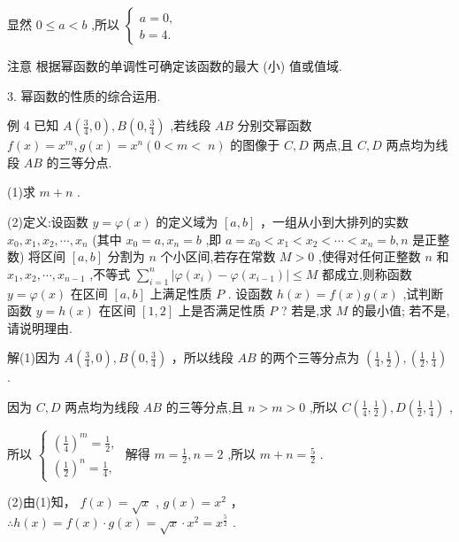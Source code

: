 \documentclass[10pt]{article}
\begin{document}
显然 \(0 \leq  a < b\) ,所以 \(\left\{  \begin{array}{l} a = 0, \\  b = 4. \end{array}\right.\)

注意 根据幂函数的单调性可确定该函数的最大 (小) 值或值域.

3. 幂函数的性质的综合运用.

例 4 已知 \(A\left( {\frac{3}{4},0}\right) ,B\left( {0,\frac{3}{4}}\right)\) ,若线段 \({AB}\) 分别交幂函数 \(f\left( x\right)  = {x}^{m},g\left( x\right)  = {x}^{n}(0 < m < \; n)\) 的图像于 \(C,D\) 两点,且 \(C,D\) 两点均为线段 \({AB}\) 的三等分点.

(1)求 \(m + n\) .

(2)定义:设函数 \(y = \varphi \left( x\right)\) 的定义域为 \(\left\lbrack  {a,b}\right\rbrack\) ，一组从小到大排列的实数 \({x}_{0},{x}_{1},{x}_{2},\cdots ,{x}_{n}\) (其中 \({x}_{0} = a,{x}_{n} = b\) ,即 \(a = {x}_{0} < {x}_{1} < {x}_{2} < \cdots  < {x}_{n} = b,n\) 是正整数) 将区间 \(\left\lbrack  {a,b}\right\rbrack\) 分割为 \(n\) 个小区间,若存在常数 \(M > 0\) ,使得对任何正整数 \(n\) 和 \({x}_{1},{x}_{2},\cdots ,{x}_{n - 1}\) ,不等式 \(\mathop{\sum }\limits_{{i = 1}}^{n}\left| {\varphi \left( {x}_{i}\right)  - \varphi \left( {x}_{i - 1}\right) }\right|  \leq  M\) 都成立,则称函数 \(y = \varphi \left( x\right)\) 在区间 \(\left\lbrack  {a,b}\right\rbrack\) 上满足性质 \(P\) . 设函数 \(h\left( x\right)  = f\left( x\right) g\left( x\right)\) ,试判断函数 \(y = h\left( x\right)\) 在区间 \(\left\lbrack  {1,2}\right\rbrack\) 上是否满足性质 \(P\) ? 若是,求 \(M\) 的最小值; 若不是, 请说明理由.

解(1)因为 \(A\left( {\frac{3}{4},0}\right) ,B\left( {0,\frac{3}{4}}\right)\) ，所以线段 \({AB}\) 的两个三等分点为 \(\left( {\frac{1}{4},\frac{1}{2}}\right) ,\left( {\frac{1}{2},\frac{1}{4}}\right)\) .

因为 \(C,D\) 两点均为线段 \({AB}\) 的三等分点,且 \(n > m > 0\) ,所以 \(C\left( {\frac{1}{4},\frac{1}{2}}\right) ,D\left( {\frac{1}{2},\frac{1}{4}}\right)\) ,

所以 \(\left\{  \begin{array}{l} {\left( \frac{1}{4}\right) }^{m} = \frac{1}{2}, \\  {\left( \frac{1}{2}\right) }^{n} = \frac{1}{4}, \end{array}\right.\) 解得 \(m = \frac{1}{2},n = 2\) ,所以 \(m + n = \frac{5}{2}\) .

(2)由(1)知， \(f\left( x\right)  = \sqrt{x}\) , \(g\left( x\right)  = {x}^{2}\) ， \(\therefore h\left( x\right)  = f\left( x\right)  \cdot  g\left( x\right)  = \sqrt{x} \cdot  {x}^{2} = {x}^{\frac{5}{2}}\) .
\end{document}
